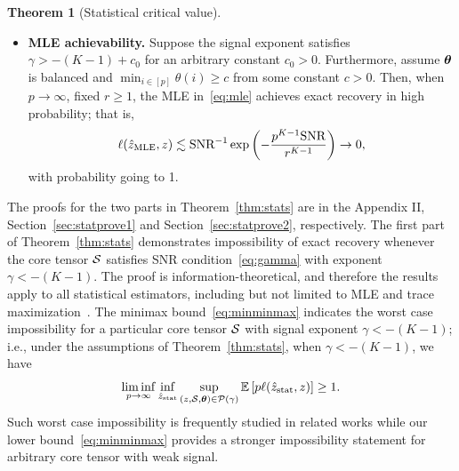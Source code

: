 \documentclass[journal]{IEEEtran}
\theoremstyle{definition}
\newtheorem{thm}{Theorem}
\theoremstyle{definition}
\begin{document}
\begin{thm}[Statistical critical value]
\begin{itemize}[wide]
\item \textbf{MLE achievability.} 
Suppose the signal exponent satisfies $\gamma >-(K-1)+c_0$ for an arbitrary constant {$c_0>0$}. Furthermore, assume {$\boldsymbol{\theta}$} is balanced and $\min_{i\in[p]}\theta(i)\geq c$ from some constant $c>0$. Then, {when $p \rightarrow \infty$, fixed $r \geq 1$, }the MLE in~\eqref{eq:mle} achieves exact recovery in high probability; that is,
\begin{equation}
\ell(\hat z_{\text{MLE}}, z) \lesssim \text{SNR}^{-1}\exp\left(-{p^{K-1}\text{SNR}\over r^{K-1}}\right) \to 0,
\end{equation}
with probability going to 1. 
\end{itemize}
\end{thm}

The proofs for the two parts in Theorem~\ref{thm:stats} are in the Appendix II, Section~\ref{sec:statprove1} and Section~\ref{sec:statprove2}, respectively. The first part of Theorem~\ref{thm:stats} demonstrates impossibility of exact recovery whenever the core tensor $\mathcal{S}$ satisfies SNR condition~\eqref{eq:gamma} with exponent $\gamma < -(K-1)$. The proof is information-theoretical, and therefore the results apply to all statistical estimators, including but not limited to MLE and trace maximization~\citep{ghoshdastidar2017uniform}. The minimax bound~\eqref{eq:minminmax} indicates the worst case impossibility for a particular core tensor $\mathcal{S}$ with signal exponent $\gamma < -(K-1)$; i.e., under the assumptions of Theorem~\ref{thm:stats}, when $\gamma < -(K-1)$, we have 
\begin{equation}
    \liminf_{p \rightarrow \infty}  \inf_{\hat z_{\text{stat}}}\sup_{ (z,\mathcal{S}, \boldsymbol{\theta}) \in \mathcal{P}(\gamma)} \mathbb{E} \left[ p\ell(\hat z_{\text{stat}}, z) \right]\geq 1.
\end{equation}
Such worst case impossibility is frequently studied in related works \citep{han2020exact, gao2018community} while our lower bound~\eqref{eq:minminmax} provides a stronger impossibility statement for arbitrary core tensor with weak signal. 
\end{document}
